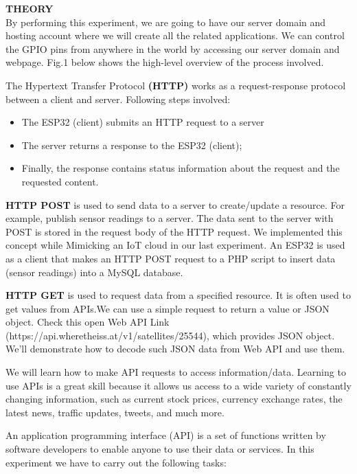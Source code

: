 \documentclass[12pt,a4paper]{article}
\begin{document}
\begin{justify}
\textbf{\large THEORY}\\[3pt]
By performing this experiment, we are going to have our server domain and hosting account where we will create all the related applications. We can control the GPIO pins from anywhere in the world by accessing our server domain and webpage. Fig.1 below shows the high-level overview of the process involved.\par
\noindent The Hypertext Transfer Protocol  \textbf{(HTTP)} works as a request-response protocol between a client and server. Following steps involved:
\vspace{-3mm}
\begin{itemize}
\setlength\itemsep{-0.3em}
\item The ESP32 (client) submits an HTTP request to a server
\item The server returns a response to the ESP32 (client);
\item Finally, the response contains status information about the request and the requested content.
\end{itemize}

\noindent \textbf{HTTP POST} is used to send data to a server to create/update a resource. For example, publish sensor readings to a server. The data sent to the server with POST is stored in the request body of the HTTP request. We implemented this concept while Mimicking an IoT cloud in our last experiment. An ESP32 is used as a client that makes an HTTP POST request to a PHP script to insert data (sensor readings) into a MySQL database.\par
\noindent \textbf{HTTP GET} is used to request data from a specified resource. It is often used to get values from APIs.We can use a simple request to return a value or JSON object. Check this open Web API Link (https://api.wheretheiss.at/v1/satellites/25544), which provides JSON object. We'll demonstrate how to decode such JSON data from Web API and use them.\par

\noindent We will learn how to make API requests to access information/data. Learning to use APIs is a great skill because it allows us access to a wide variety of constantly changing information, such as current stock prices, currency exchange rates, the latest news, traffic updates, tweets, and much more.\par

\noindent An application programming interface (API) is a set of functions written by software developers to enable anyone to use their data or services. In this experiment we have to carry out the following tasks:


\end{justify}
\end{document}
